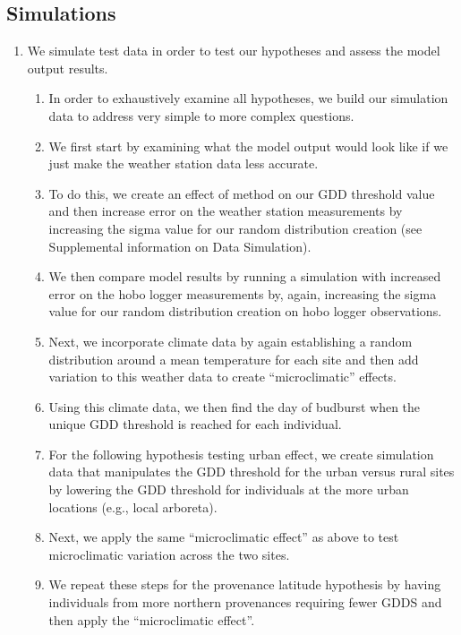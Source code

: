 \documentclass{article}\usepackage[]{graphicx}\usepackage[]{color}
\begin{document}
\subsection*{Simulations} %
\begin{enumerate}
\item We simulate test data in order to test our hypotheses and assess the model output results. 
  \begin{enumerate}
  \item In order to exhaustively examine all hypotheses, we build our simulation data to address very simple to more complex questions.
  \item We first start by examining what the model output would look like if we just make the weather station data less accurate.
  \item To do this, we create an effect of method on our GDD threshold value and then increase error on the weather station measurements by increasing the sigma value for our random distribution creation (see Supplemental information on Data Simulation). 
  \item We then compare model results by running a simulation with increased error on the hobo logger measurements by, again, increasing the sigma value for our random distribution creation on hobo logger observations.
  \item Next, we incorporate climate data by again establishing a random distribution around a mean temperature for each site and then add variation to this weather data to create ``microclimatic'' effects. 
  \item Using this climate data, we then find the day of budburst when the unique GDD threshold is reached for each individual. 
  \item For the following hypothesis testing urban effect, we create simulation data that manipulates the GDD threshold for the urban versus rural sites by lowering the GDD threshold for individuals at the more urban locations (e.g., local arboreta). 
  \item Next, we apply the same ``microclimatic effect'' as above to test microclimatic variation across the two sites. 
  \item We repeat these steps for the provenance latitude hypothesis by having individuals from more northern provenances requiring fewer GDDS and then apply the ``microclimatic effect''.
  \end{enumerate}
\end{enumerate}
\end{document}
